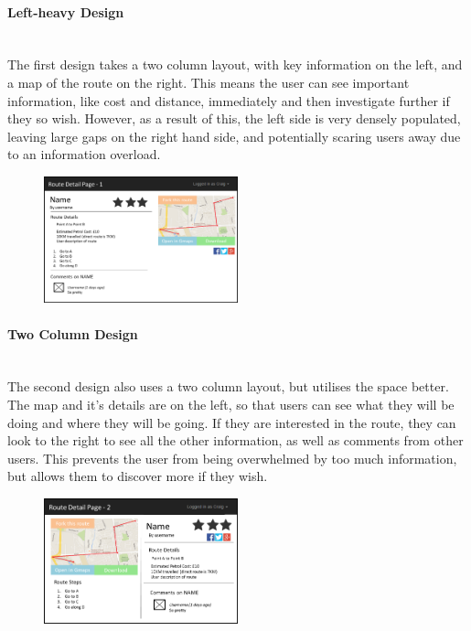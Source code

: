 \paragraph{Left-heavy Design}\ \\
The first design takes a two column layout, with key information on the left, and a map of the route on the right. This means the user can see important information, like cost and distance, immediately and then investigate further if they so wish. However, as a result of this, the left side is very densely populated, leaving large gaps on the right hand side, and potentially scaring users away due to an information overload.
\begin{figure}[!ht]
	\begin{center}
		\includegraphics[width=0.5\textwidth]{images/ui-detail-1.png}
	\end{center}
	\vspace{-6mm}
\end{figure}

\paragraph{Two Column Design}\ \\
The second design also uses a two column layout, but utilises the space better. The map and it's details are on the left, so that users can see what they will be doing and where they will be going. If they are interested in the route, they can look to the right to see all the other information, as well as comments from other users. This prevents the user from being overwhelmed by too much information, but allows them to discover more if they wish.
\begin{figure}[!ht]
	\begin{center}
		\includegraphics[width=0.5\textwidth]{images/ui-detail-2.png}
	\end{center}
	\vspace{-12mm}
\end{figure}


